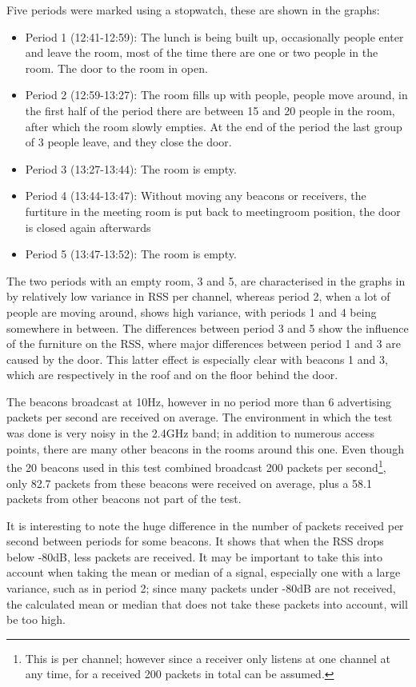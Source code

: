 Five periods were marked using a stopwatch, these are shown in the graphs:
\begin{itemize}
    \item Period 1 (12:41-12:59): The lunch is being built up, occasionally people enter and leave the room, most of the time there are one or two people in the room.
        The door to the room in open.
    \item Period 2 (12:59-13:27): The room fills up with people, people move around, in the first half of the period there are between 15 and 20 people in the room, after which the room slowly empties.
        At the end of the period the last group of 3 people leave, and they close the door.
    \item Period 3 (13:27-13:44): The room is empty.
    \item Period 4 (13:44-13:47): Without moving any beacons or receivers, the furtiture in the meeting room is put back to meetingroom position, the door is closed again afterwards
    \item Period 5 (13:47-13:52): The room is empty.
\end{itemize}

The two periods with an empty room, 3 and 5, are characterised in the graphs in  by relatively low variance in RSS per channel, whereas period 2, when a lot of people are moving around, shows high variance, with periods 1 and 4 being somewhere in between.
The differences between period 3 and 5 show the influence of the furniture on the RSS, where major differences between period 1 and 3 are caused by the door.
This latter effect is especially clear with beacons 1 and 3, which are respectively in the roof and on the floor behind the door.

The beacons broadcast at 10Hz, however in no period more than 6 advertising packets per second are received on average.
The environment in which the test was done is very noisy in the 2.4GHz band; in addition to numerous \wifi access points, there are many other beacons in the rooms around this one. 
Even though the 20 beacons used in this test combined broadcast 200 packets per second\footnote{This is per channel; however since a receiver only listens at one channel at any time, for a received 200 packets in total can be assumed.}, only 82.7 packets from these beacons were received on average, plus a 58.1 packets from other beacons not part of the test.

It is interesting to note the huge difference in the number of packets received per second between periods for some beacons.
It shows that when the RSS drops below -80dB, less packets are received.
It may be important to take this into account when taking the mean or median of a signal, especially one with a large variance, such as in period 2; since many packets under -80dB are not received, the calculated mean or median that does not take these packets into account, will be too high.
